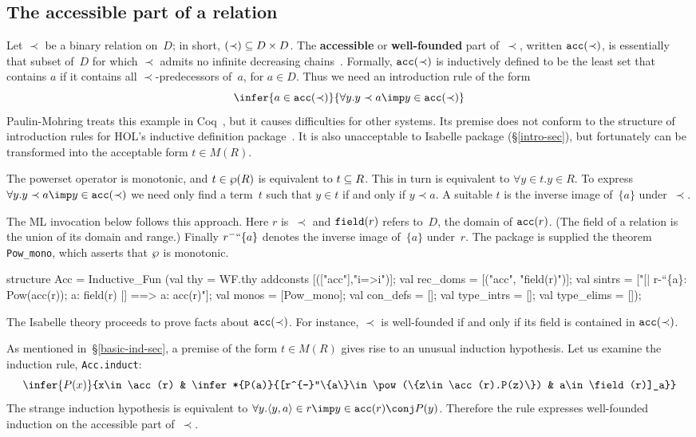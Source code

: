 \subsection{The accessible part of a relation}\label{acc-sec}
Let $\prec$ be a binary relation on~$D$; in short, $(\prec)\subseteq D\times D$.
The {\bf accessible} or {\bf well-founded} part of~$\prec$, written
${\tt acc}(\prec)$, is essentially that subset of~$D$ for which $\prec$ admits
no infinite decreasing chains~\cite{aczel77}.  Formally, ${\tt acc}(\prec)$ is
inductively defined to be the least set that contains $a$ if it contains
all $\prec$-predecessors of~$a$, for $a\in D$.  Thus we need an
introduction rule of the form 
\[ \infer{a\in\acc(\prec)}{\forall y.y\prec a\imp y\in\acc(\prec)} \]
Paulin-Mohring treats this example in Coq~\cite{paulin92}, but it causes
difficulties for other systems.  Its premise does not conform to 
the structure of introduction rules for HOL's inductive definition
package~\cite{camilleri92}.  It is also unacceptable to Isabelle package
(\S\ref{intro-sec}), but fortunately can be transformed into the acceptable
form $t\in M(R)$.

The powerset operator is monotonic, and $t\in\wp(R)$ is equivalent to
$t\subseteq R$.  This in turn is equivalent to $\forall y\in t. y\in R$.  To
express $\forall y.y\prec a\imp y\in\acc(\prec)$ we need only find a
term~$t$ such that $y\in t$ if and only if $y\prec a$.  A suitable $t$ is
the inverse image of~$\{a\}$ under~$\prec$.

The ML invocation below follows this approach.  Here $r$ is~$\prec$ and
${\tt field}(r)$ refers to~$D$, the domain of ${\tt acc}(r)$.  (The field of a
relation is the union of its domain and range.)  Finally
$r^{-}``\{a\}$ denotes the inverse image of~$\{a\}$ under~$r$.  The package is
supplied the theorem {\tt Pow\_mono}, which asserts that $\wp$ is monotonic.
\begin{ttbox}
structure Acc = Inductive_Fun
 (val thy = WF.thy addconsts [(["acc"],"i=>i")];
  val rec_doms = [("acc", "field(r)")];
  val sintrs = 
      ["[| r-``\{a\}: Pow(acc(r)); a: field(r) |] ==> a: acc(r)"];
  val monos = [Pow_mono];
  val con_defs = [];
  val type_intrs = [];
  val type_elims = []);
\end{ttbox}
The Isabelle theory proceeds to prove facts about ${\tt acc}(\prec)$.  For
instance, $\prec$ is well-founded if and only if its field is contained in
${\tt acc}(\prec)$.  

As mentioned in~\S\ref{basic-ind-sec}, a premise of the form $t\in M(R)$
gives rise to an unusual induction hypothesis.  Let us examine the
induction rule, {\tt Acc.induct}:
\[ \infer{P(x)}{x\in\acc(r) &
     \infer*{P(a)}{[r^{-}``\{a\}\in\pow(\{z\in\acc(r).P(z)\}) & 
                   a\in\field(r)]_a}}
\]
The strange induction hypothesis is equivalent to
$\forall y. \pair{y,a}\in r\imp y\in\acc(r)\conj P(y)$.
Therefore the rule expresses well-founded induction on the accessible part
of~$\prec$.

